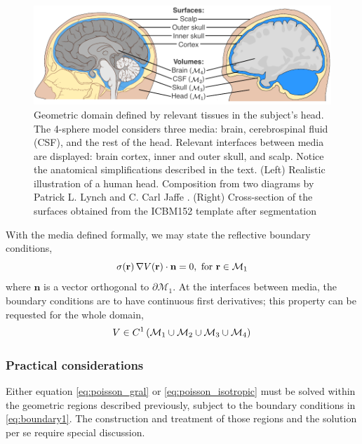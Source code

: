 \begin{figure}
\centering
\includegraphics[width=\linewidth]{./img/HeadSurfacesVolumes}
\caption{Geometric domain defined by relevant tissues in the subject's head. The 4-sphere model considers three media: brain, cerebrospinal fluid (CSF), and the rest of the head. Relevant interfaces between media are displayed: brain cortex, inner and outer skull, and scalp. Notice the anatomical simplifications described in the text. (Left) Realistic illustration of a human head. Composition from two diagrams by Patrick L. Lynch and C. Carl Jaffe \cite{wikipic1, wikipic2}.  (Right) Cross-section of the surfaces obtained from the ICBM152 template after segmentation}
\label{fig:diagrams2}
\end{figure}

With the media defined formally, we may state the reflective boundary conditions,
\begin{equation}
\sigma(\mathbf{r})\, \nabla V(\mathbf{r}) \cdot \mathbf{n} = 0, 
\text{ for } \mathbf{r} \in \mathcal{M}_1
\label{eq:boundary1}
\end{equation}
where $\mathbf{n}$ is a vector orthogonal to $\partial\mathcal{M}_1$.
%
At the interfaces between media, the boundary conditions are to have continuous first derivatives; this property can be requested for the whole domain,
\begin{equation}
    V \in C^1\left( \mathcal{M}_1 \cup \mathcal{M}_2 \cup \mathcal{M}_3 \cup \mathcal{M}_4  \right)
\end{equation}

\subsubsection{Practical considerations}

Either equation \eqref{eq:poisson_gral} or \eqref{eq:poisson_isotropic} must be solved within the geometric regions described previously, subject to the boundary conditions in \eqref{eq:boundary1}.
%
The construction and treatment of those regions and the solution per se require special discussion.

